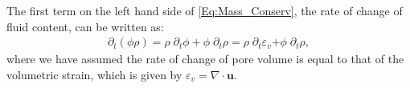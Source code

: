 The first term on the left hand side of \eqref{Eq:Mass_Conserv}, the rate of change of fluid content, can be written as:
\begin{equation}\label{Eq:diff_m}
    \begin{aligned}
        \partial_t\left(\phi\rho\right) = \rho \; \partial_t \phi +\phi \; \partial_t \rho  = \rho \;  \partial_t \varepsilon_v{+\phi \; \partial_t \rho},
    \end{aligned}
\end{equation}
where we have assumed the rate of change of pore volume is equal to that of the volumetric strain, which is given by $\varepsilon_v= \nabla \cdot \bm{u}$. 


